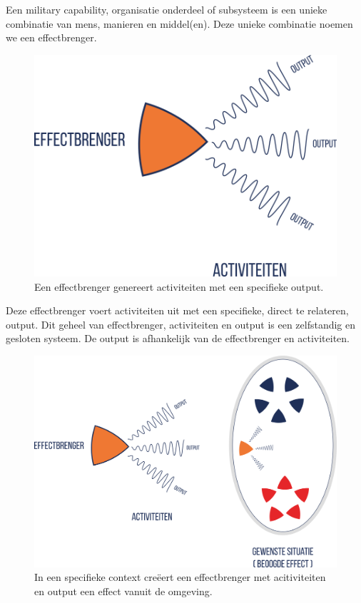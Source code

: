 \documentclass[
]{book}
\begin{document}
Een military capability, organisatie onderdeel of subsysteem is een unieke combinatie van mens, manieren en middel(en). Deze unieke combinatie noemen we een effectbrenger.

\begin{figure}
\includegraphics[width=400pt]{data/images/20210324-MDI-effectbrenger} \caption{Een effectbrenger genereert activiteiten met een specifieke output.}\label{fig:effectbrenger}
\end{figure}

Deze effectbrenger voert activiteiten uit met een specifieke, direct te relateren, output. Dit geheel van effectbrenger, activiteiten en output is een zelfstandig en gesloten systeem. De output is afhankelijk van de effectbrenger en activiteiten.

\begin{figure}
\includegraphics[width=450pt]{data/images/20210324-MDI-effectbrenger-ei} \caption{In een specifieke context creëert een effectbrenger met acitiviteiten en output een effect vanuit de omgeving.}\label{fig:effectbrenger-met-ei}
\end{figure}
\end{document}
